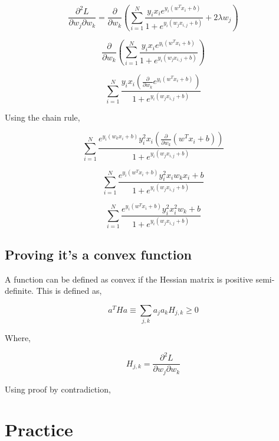 \documentclass[]{report}   %
\begin{document}
$$\frac{\partial^2 L}{\partial w_j\partial w_k}=\frac{\partial}{\partial w_k}(\sum_{i=1}^{N}\frac{y_ix_ie^{y_i(w^Tx_i+b)}}{1+e^{y_i(w_jx_{i,j}+b)}}+2\lambda w_j)$$

$$\frac{\partial}{\partial w_k}(\sum_{i=1}^{N}\frac{y_ix_ie^{y_i(w^Tx_i+b)}}{1+e^{y_i(w_jx_{i,j}+b)}})$$

$$\sum_{i=1}^{N}\frac{y_ix_i(\frac{\partial}{\partial w_k}e^{y_i(w^Tx_i+b)})}{1+e^{y_i(w_jx_{i,j}+b)}}$$

Using the chain rule,

$$\sum_{i=1}^{N}\frac{e^{y_i(w_kx_i+b)}y_i^2x_i(\frac{\partial}{\partial w_k}(w^Tx_i+b))}{1+e^{y_i(w_jx_{i,j}+b)}}$$

$$\sum_{i=1}^{N}\frac{e^{y_i(w^Tx_i+b)}y_i^2x_iw_kx_i+b}{1+e^{y_i(w_jx_{i,j}+b)}}$$

$$\sum_{i=1}^{N}\frac{e^{y_i(w^Tx_i+b)}y_i^2x_i^2w_k+b}{1+e^{y_i(w_jx_{i,j}+b)}}$$

\section{Proving it's a convex function}

A function can be defined as convex if the Hessian matrix is positive semi-definite. This is defined as,

$$a^THa\equiv\sum_{j,k}a_ja_kH_{j,k}\geq0$$

Where,

$$H_{j,k}=\frac{\partial^2L}{\partial w_j\partial w_k}$$

Using proof by contradiction, 




\chapter{Practice}
\end{document}
